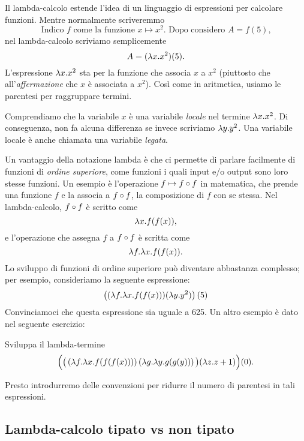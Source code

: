 \documentclass{article}
\begin{document}
Il lambda-calcolo estende l'idea di un linguaggio di espressioni 
per calcolare funzioni. Mentre normalmente scriveremmo
\[   \mbox{Indico $f$ come la funzione $x\mapsto x^2$. Dopo considero $A=f(5)$,}
\]
nel lambda-calcolo scriviamo semplicemente
\[   A = (\lambda x.x^2)(5)  .
\]
L'espressione $\lambda x.x^2$ sta per la funzione che associa $x$ a $x^2$ 
(piuttosto che all'{\em affermazione} che $x$ \`e associata a
$x^2$). Cos\`i come in aritmetica, usiamo le parentesi per raggruppare termini.

Comprendiamo che la variabile $x$ \`e una variabile {\em locale} nel termine $\lambda x.x^2$. 
Di conseguenza, non fa alcuna differenza se invece scriviamo
$\lambda y.y^2$. Una variabile locale \`e anche chiamata una
variabile {\em legata}.

Un vantaggio della notazione lambda \`e che ci permette di parlare
facilmente di funzioni di {\em ordine superiore}, come funzioni i quali input
e/o output sono loro stesse funzioni. Un esempio \`e l'operazione
$f\mapsto f\circ f$ in matematica, che prende una funzione $f$ e la associa a $f\circ f$, 
la composizione di $f$ con se stessa. Nel lambda-calcolo, $f\circ f$ \`e scritto come
\[         \lambda x.f(f(x)),   
\]
e l'operazione che assegna $f$ a $f\circ f$ \`e scritta come
\[         \lambda f.\lambda x.f(f(x)).
\]
Lo sviluppo di funzioni di ordine superiore pu\`o diventare abbastanza complesso;
per esempio, consideriamo la seguente espressione:
\[         \left((\lambda f.\lambda x.f(f(x)))(\lambda y.y^2)\right)(5)
\]
Convinciamoci che questa espressione sia uguale a 625. Un altro esempio \`e dato
nel seguente esercizio:

\begin{exercise}
Sviluppa il lambda-termine
\[        \Big(
          \big(\left(\lambda f.\lambda x.f(f(f(x)))\right)
          \left(\lambda g.\lambda y.g(g(y))\right)\big)
          (\lambda z.z+1)\Big)(0).
\]
\end{exercise}

Presto introdurremo delle convenzioni per ridurre il numero di
parentesi in tali espressioni.

\subsection{Lambda-calcolo tipato vs non tipato}
\end{document}

